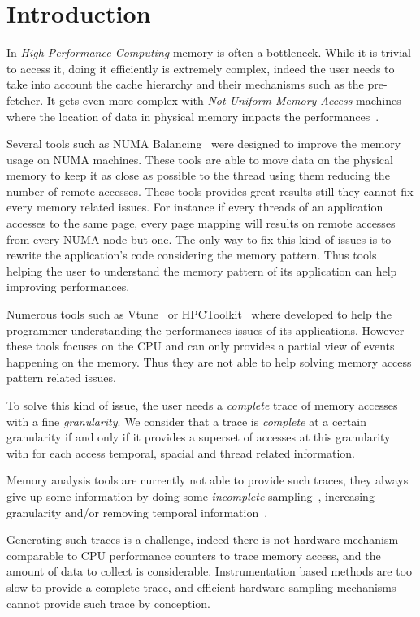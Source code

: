 \section{Introduction}
\label{sec:intro}

In \emph{High Performance Computing} memory is often a bottleneck.
While it is trivial to access it, doing it efficiently is extremely
complex, indeed the user needs to take into account the cache hierarchy and
their mechanisms such as the pre-fetcher. It gets even more complex with
\emph{Not Uniform Memory Access} machines where the location of data in
physical memory impacts the performances~\cite{Drepper07What}.

Several tools such as NUMA Balancing~\cite{Corbet2012} were designed to improve the
memory usage on NUMA machines. These tools are able to move data on the
physical memory to keep it as close as possible to the thread using them
reducing the number of remote accesses. These tools provides great results
still they cannot fix every memory related issues. For instance if every
threads of an application accesses to the same page, every page mapping will
results on remote accesses from every NUMA node but one. The only way to fix
this kind of issues is to rewrite the application's code considering the
memory pattern. Thus tools helping the user to understand the memory pattern
of its application can help improving performances.

Numerous tools such as Vtune~\cite{Reinders05VTune} or
HPCToolkit~\cite{Adhianto10HPCTOOLKIT} where developed to help the programmer
understanding the performances issues of its applications. However these tools
focuses on the CPU and can only provides a partial view of events happening on
the memory. Thus they are not able to help solving memory access pattern
related issues.

To solve this kind of issue, the user needs a \emph{complete} trace of memory
accesses with a fine \emph{granularity}. We consider that a trace is
\emph{complete} at a certain granularity if and only if it provides a superset
of accesses at this granularity with for each access temporal, spacial and
thread related information.

Memory analysis tools are currently not able to provide such traces, they
always give up some information by doing some \emph{incomplete}
sampling~\cite{Liu14Tool,Lachaize12MemProf}, increasing granularity and/or
removing temporal information~\cite{Beniamine15TABARNACRR}.

Generating such traces is a challenge, indeed there is not hardware mechanism
comparable to CPU performance counters to trace memory access, and the amount
of data to collect is considerable. Instrumentation based methods are too slow
to provide a complete trace, and efficient hardware sampling mechanisms cannot
provide such trace by conception.


